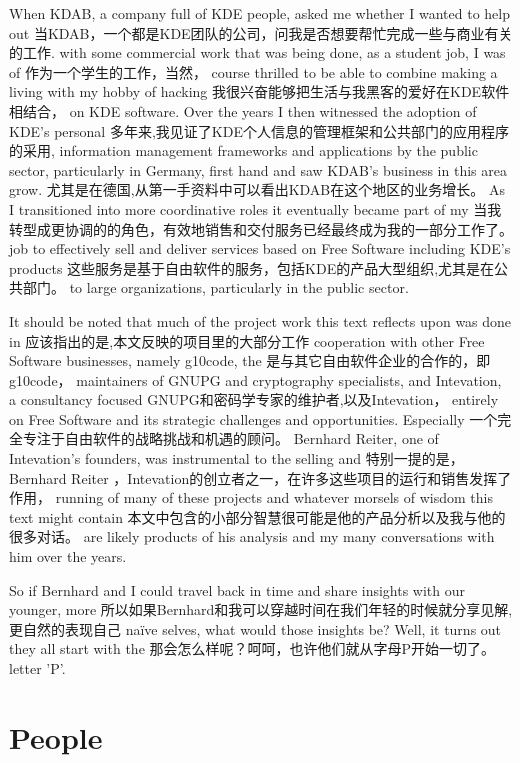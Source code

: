 When KDAB, a company full of KDE people, asked me whether I wanted to help out
当KDAB，一个都是KDE团队的公司，问我是否想要帮忙完成一些与商业有关的工作.
with some commercial work that was being done, as a student job, I was of
作为一个学生的工作，当然，
course thrilled to be able to combine making a living with my hobby of hacking
我很兴奋能够把生活与我黑客的爱好在KDE软件相结合，
on KDE software. Over the years I then witnessed the adoption of KDE's personal
多年来,我见证了KDE个人信息的管理框架和公共部门的应用程序的采用,
information management frameworks and applications by the public sector,
particularly in Germany, first hand and saw KDAB's business in this area grow.
尤其是在德国,从第一手资料中可以看出KDAB在这个地区的业务增长。
As I transitioned into more coordinative roles it eventually became part of my
当我转型成更协调的的角色，有效地销售和交付服务已经最终成为我的一部分工作了。
job to effectively sell and deliver services based on Free Software including KDE's products
这些服务是基于自由软件的服务，包括KDE的产品大型组织,尤其是在公共部门。
to large organizations, particularly in the public sector.

It should be noted that much of the project work this text reflects upon was done in
应该指出的是,本文反映的项目里的大部分工作
cooperation with other Free Software businesses, namely g10code, the
是与其它自由软件企业的合作的，即g10code，
maintainers of GNUPG and cryptography specialists, and Intevation, a consultancy focused
GNUPG和密码学专家的维护者,以及Intevation，
entirely on Free Software and its strategic challenges and opportunities. Especially
一个完全专注于自由软件的战略挑战和机遇的顾问。
Bernhard Reiter, one of Intevation's founders, was instrumental to the selling and
特别一提的是，Bernhard Reiter ，Intevation的创立者之一，在许多这些项目的运行和销售发挥了作用，
running of many of these projects and whatever morsels of wisdom this text might contain
本文中包含的小部分智慧很可能是他的产品分析以及我与他的很多对话。
are likely products of his analysis and my many conversations with him over the years.

So if Bernhard and I could travel back in time and share insights with our younger, more
所以如果Bernhard和我可以穿越时间在我们年轻的时候就分享见解,更自然的表现自己
naïve selves, what would those insights be? Well, it turns out they all start with the
那会怎么样呢？呵呵，也许他们就从字母P开始一切了。
letter 'P'.

\section*{People}

